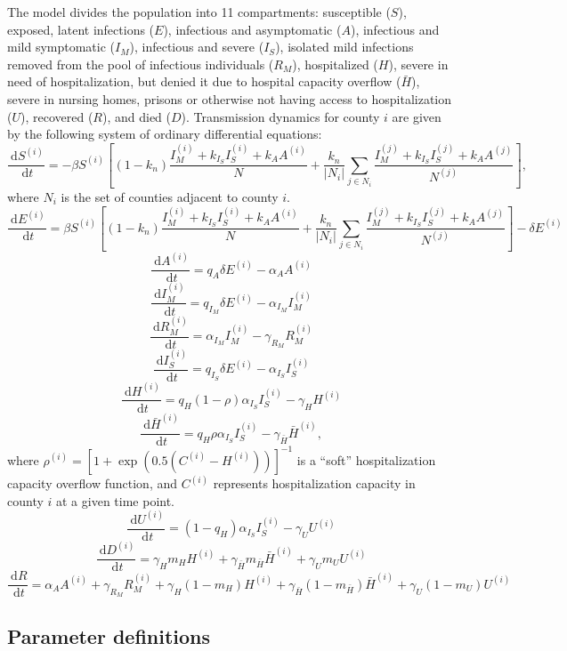 \documentclass[11pt]{article}
\newcommand{\dx}[1]{\ \text{d} #1}
\begin{document}
The model divides the population into 11 compartments: susceptible ($S$), exposed, latent infections ($E$), infectious and asymptomatic ($A$), infectious and mild symptomatic ($I_M$), infectious and severe ($I_S$), isolated mild infections removed from the pool of infectious individuals ($R_M$), hospitalized ($H$), severe in need of hospitalization, but denied it due to hospital capacity overflow ($\bar{H}$), severe in nursing homes, prisons or otherwise not having access to hospitalization ($U$), recovered ($R$), and died ($D$).  Transmission dynamics for county $i$  are given by the following system of ordinary differential equations: 
\[ \frac{\dx{S^{(i)}}}{\dx{t}} = -\beta S^{(i)} \left[ (1-k_n) \frac{ I_M^{(i)} + k_{I_S} I_S^{(i)} + k_A A^{(i)}}{N} + \frac{k_n}{|N_i|} \sum_{j\in N_i}  \frac{I_M^{(j)} + k_{I_S} I_S^{(j)} + k_A A^{(j)}}{N^{(j)}} \right], \]
where $N_i$ is the set of counties adjacent to county $i$.
\[ \frac{\dx{E^{(i)}}}{\dx{t}} = \beta S^{(i)} \left[ (1-k_n) \frac{ I_M^{(i)} + k_{I_S} I_S^{(i)} + k_A A^{(i)}}{N} + \frac{k_n}{|N_i|} \sum_{j\in N_i}  \frac{I_M^{(j)} + k_{I_S} I_S^{(j)} + k_A A^{(j)}}{N^{(j)}} \right] - \delta E^{(i)} \]
\[ \frac{\dx{A^{(i)}}}{\dx{t}} = q_A \delta E^{(i)} - \alpha_A A^{(i)} \]
\[ \frac{\dx{I_M^{(i)}}}{\dx{t}} = q_{I_M} \delta E^{(i)} - \alpha_{I_M} I_M^{(i)} \]
\[ \frac{\dx{R_M^{(i)}}}{\dx{t}} = \alpha_{I_M} I_M^{(i)} - \gamma_{R_M} R_M^{(i)} \]
\[ \frac{\dx{I_S^{(i)}}}{\dx{t}} = q_{I_S} \delta E^{(i)} - \alpha_{I_S} I_S^{(i)} \]
\[ \frac{\dx{H^{(i)}}}{\dx{t}} =  q_H (1 - \rho) \alpha_{I_S} I_S^{(i)} - \gamma_H H^{(i)}  \]
\[ \frac{\dx{\bar{H}^{(i)}}}{\dx{t}} =  q_H \rho \alpha_{I_S} I_S^{(i)} - \gamma_{\bar{H}} \bar{H}^{(i)},  \]
where $\rho^{(i)} = \left[ 1+\exp(0.5(C^{(i)}-H^{(i)})) \right]^{-1}$ is a ``soft'' hospitalization capacity overflow function, and $C^{(i)}$ represents hospitalization capacity in county $i$ at a given time point.
\[ \frac{\dx{U^{(i)}}}{\dx{t}} =  (1 - q_H) \alpha_{I_S} I_S^{(i)} - \gamma_{U} U^{(i)}  \]
\[ \frac{\dx{D^{(i)}}}{\dx{t}} = \gamma_H m_H H^{(i)} + \gamma_{\bar{H}}  m_{\bar{H}} \bar{H}^{(i)} + \gamma_{U} m_{U} U^{(i)} \]
\[ \frac{\dx{R}}{\dx{t}} = \alpha_A A^{(i)} + \gamma_{R_M} R_M^{(i)} + \gamma_H (1-m_H) H^{(i)} + \gamma_{\bar{H}} (1 - m_{\bar{H}}) \bar{H}^{(i)} + \gamma_{U} (1- m_{U}) U^{(i)}  \]




\subsection{Parameter definitions}
\end{document}

